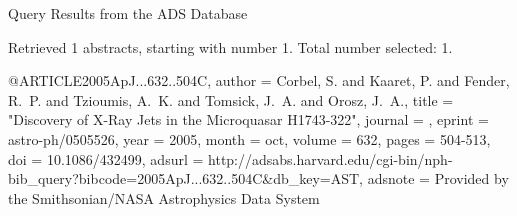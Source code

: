 Query Results from the ADS Database


Retrieved 1 abstracts, starting with number 1.  Total number selected: 1.

@ARTICLE{2005ApJ...632..504C,
   author = {{Corbel}, S. and {Kaaret}, P. and {Fender}, R.~P. and {Tzioumis}, A.~K. and 
	{Tomsick}, J.~A. and {Orosz}, J.~A.},
    title = "{Discovery of X-Ray Jets in the Microquasar H1743-322}",
  journal = {\apj},
   eprint = {astro-ph/0505526},
     year = 2005,
    month = oct,
   volume = 632,
    pages = {504-513},
      doi = {10.1086/432499},
   adsurl = {http://adsabs.harvard.edu/cgi-bin/nph-bib_query?bibcode=2005ApJ...632..504C&db_key=AST},
  adsnote = {Provided by the Smithsonian/NASA Astrophysics Data System}
}


